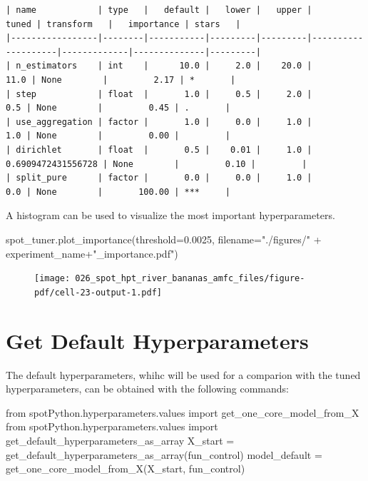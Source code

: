 \documentclass[
  letterpaper,
  DIV=11,
  numbers=noendperiod]{scrreprt}
\newenvironment{Shaded}{\begin{snugshade}}{\end{snugshade}}
\newcommand{\FloatTok}[1]{\textcolor[rgb]{0.68,0.00,0.00}{#1}}
\newcommand{\ImportTok}[1]{\textcolor[rgb]{0.00,0.46,0.62}{#1}}
\newcommand{\NormalTok}[1]{\textcolor[rgb]{0.00,0.23,0.31}{#1}}
\newcommand{\OperatorTok}[1]{\textcolor[rgb]{0.37,0.37,0.37}{#1}}
\newcommand{\StringTok}[1]{\textcolor[rgb]{0.13,0.47,0.30}{#1}}
\begin{document}
\begin{verbatim}
| name            | type   |   default |   lower |   upper |              tuned | transform   |   importance | stars   |
|-----------------|--------|-----------|---------|---------|--------------------|-------------|--------------|---------|
| n_estimators    | int    |      10.0 |     2.0 |    20.0 |               11.0 | None        |         2.17 | *       |
| step            | float  |       1.0 |     0.5 |     2.0 |                0.5 | None        |         0.45 | .       |
| use_aggregation | factor |       1.0 |     0.0 |     1.0 |                1.0 | None        |         0.00 |         |
| dirichlet       | float  |       0.5 |    0.01 |     1.0 | 0.6909472431556728 | None        |         0.10 |         |
| split_pure      | factor |       0.0 |     0.0 |     1.0 |                0.0 | None        |       100.00 | ***     |
\end{verbatim}

A histogram can be used to visualize the most important hyperparameters.

\begin{Shaded}
\begin{Highlighting}[]
\NormalTok{spot\_tuner.plot\_importance(threshold}\OperatorTok{=}\FloatTok{0.0025}\NormalTok{, filename}\OperatorTok{=}\StringTok{"./figures/"} \OperatorTok{+}\NormalTok{ experiment\_name}\OperatorTok{+}\StringTok{"\_importance.pdf"}\NormalTok{)}
\end{Highlighting}
\end{Shaded}

\begin{figure}[H]

{\centering \texttt{[image: 026\_spot\_hpt\_river\_bananas\_amfc\_files/figure-pdf/cell-23-output-1.pdf]}

}

\end{figure}

\hypertarget{get-default-hyperparameters-7}{%
\section{Get Default
Hyperparameters}\label{get-default-hyperparameters-7}}

The default hyperparameters, whihc will be used for a comparion with the
tuned hyperparameters, can be obtained with the following commands:

\begin{Shaded}
\begin{Highlighting}[]
\ImportTok{from}\NormalTok{ spotPython.hyperparameters.values }\ImportTok{import}\NormalTok{ get\_one\_core\_model\_from\_X}
\ImportTok{from}\NormalTok{ spotPython.hyperparameters.values }\ImportTok{import}\NormalTok{ get\_default\_hyperparameters\_as\_array}
\NormalTok{X\_start }\OperatorTok{=}\NormalTok{ get\_default\_hyperparameters\_as\_array(fun\_control)}
\NormalTok{model\_default }\OperatorTok{=}\NormalTok{ get\_one\_core\_model\_from\_X(X\_start, fun\_control)}
\end{Highlighting}
\end{Shaded}
\end{document}
